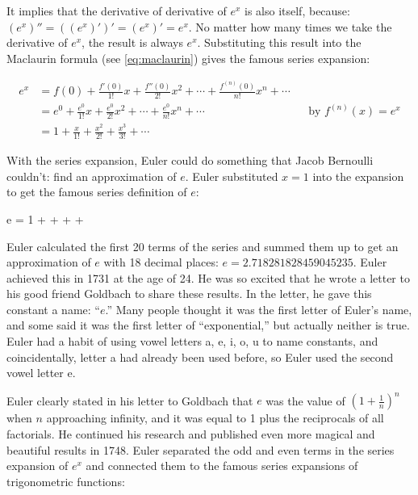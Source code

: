 \documentclass[b5paper]{article}
\begin{document}
It implies that the derivative of derivative of $e^x$ is also itself, because: $(e^x)'' = ((e^x)')' = (e^x)' = e^x$. No matter how many times we take the derivative of $e^x$, the result is always $e^x$. Substituting this result into the Maclaurin formula (see \cref{eq:maclaurin}) gives the famous series expansion:

\begin{align*}
e^x &= f(0) + \frac{f'(0)}{1!}x + \frac{f''(0)}{2!}x^2 + \dotsb + \frac{f^{(n)}(0)}{n!}x^n + \dotsb \\
  &= e^0 + \frac{e^0}{1!}x + \frac{e^{0}}{2!}x^2 + \dotsb + \frac{e^0}{n!}x^n + \dotsb && \text{by }f^{(n)}(x) = e^x \\
  &= 1 + \frac{x}{1!} + \frac{x^2}{2!} + \frac{x^3}{3!} + \dotsb
\end{align*}

With the series expansion, Euler could do something that Jacob Bernoulli couldn't: find an approximation of $e$. Euler substituted $x = 1$ into the expansion to get the famous series definition of $e$:

\be
e = 1 +  +  +  + \dotsb
\ee

Euler calculated the first 20 terms of the series and summed them up to get an approximation of $e$ with 18 decimal places: $e = 2.718281828459045235$. Euler achieved this in 1731 at the age of 24. He was so excited that he wrote a letter to his good friend Goldbach to share these results. In the letter, he gave this constant a name: \enquote{$e$.} Many people thought it was the first letter of Euler's name, and some said it was the first letter of \enquote{exponential,} but actually neither is true. Euler had a habit of using vowel letters a, e, i, o, u to name constants, and coincidentally, letter a had already been used before, so Euler used the second vowel letter e.


Euler clearly stated in his letter to Goldbach that $e$ was the value of $(1 + \frac{1}{n})^n$ when $n$ approaching infinity, and it was equal to 1 plus the reciprocals of all factorials. He continued his research and published even more magical and beautiful results in 1748. Euler separated the odd and even terms in the series expansion of $e^x$ and connected them to the famous series expansions of trigonometric functions:
\end{document}
